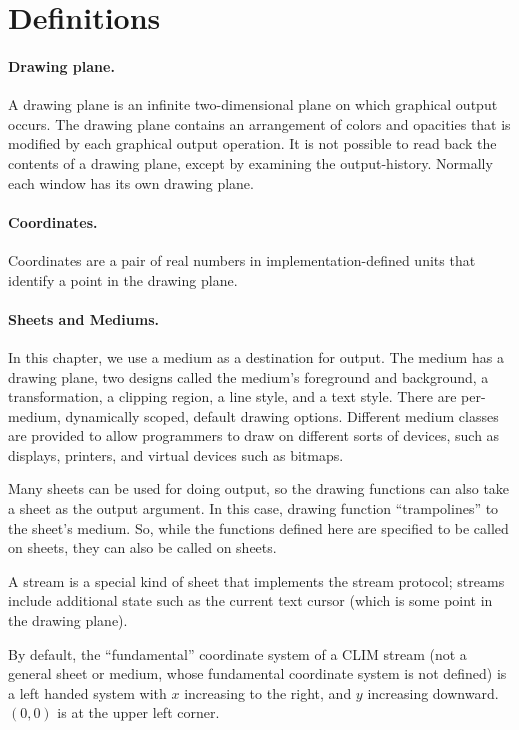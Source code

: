 \section {Definitions}

\paragraph {Drawing plane.}

A drawing plane is an infinite two-dimensional plane on which graphical output
occurs.  The drawing plane contains an arrangement of colors and opacities that
is modified by each graphical output operation.  It is not possible to read back
the contents of a drawing plane, except by examining the output-history.
Normally each window has its own drawing plane.

\paragraph {Coordinates.}

Coordinates are a pair of real numbers in implementation-defined units that
identify a point in the drawing plane.

\paragraph {Sheets and Mediums.}

In this chapter, we use a medium as a destination for output.  The medium has a
drawing plane, two designs called the medium's foreground and background, a
transformation, a clipping region, a line style, and a text style.  There are
per-medium, dynamically scoped, default drawing options.  Different medium
classes are provided to allow programmers to draw on different sorts of devices,
such as displays, printers, and virtual devices such as bitmaps.

Many sheets can be used for doing output, so the drawing functions can also take
a sheet as the output argument.  In this case, drawing function ``trampolines''
to the sheet's medium.  So, while the functions defined here are specified to be
called on sheets, they can also be called on sheets.

A stream is a special kind of sheet that implements the stream protocol; streams
include additional state such as the current text cursor (which is some point in
the drawing plane).

By default, the ``fundamental'' coordinate system of a CLIM stream (not a
general sheet or medium, whose fundamental coordinate system is not defined) is
a left handed system with $x$ increasing to the right, and $y$ increasing
downward.  $(0,0)$ is at the upper left corner.


